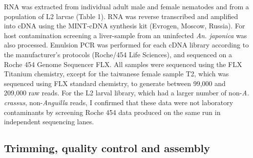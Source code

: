 RNA was extracted from individual adult male and female nematodes and
from a population of L2 larvae (Table 1). RNA was reverse transcribed
and amplified into cDNA using the MINT-cDNA synthesis kit (Evrogen,
Moscow, Russia).  For host contamination screening a liver-sample from
an uninfected \textit{An. japonica} was also processed. Emulsion PCR
was performed for each cDNA library according to the manufacturer’s
protocols (Roche/454 Life Sciences), and sequenced on a Roche 454
Genome Sequencer FLX. All samples were sequenced using the FLX
Titanium chemistry, except for the taiwanese female sample T2, which
was sequenced using FLX standard chemistry, to generate between 99,000
and 209,000 raw reads. For the L2 larval library, which had a larger
number of non-\textit{A. crassus}, non-\textit{Anguilla} reads, I
confirmed that these data were not laboratory contaminants by
screening Roche 454 data produced on the same run in independent
sequencing lanes.


\subsection{Trimming, quality control and assembly}

